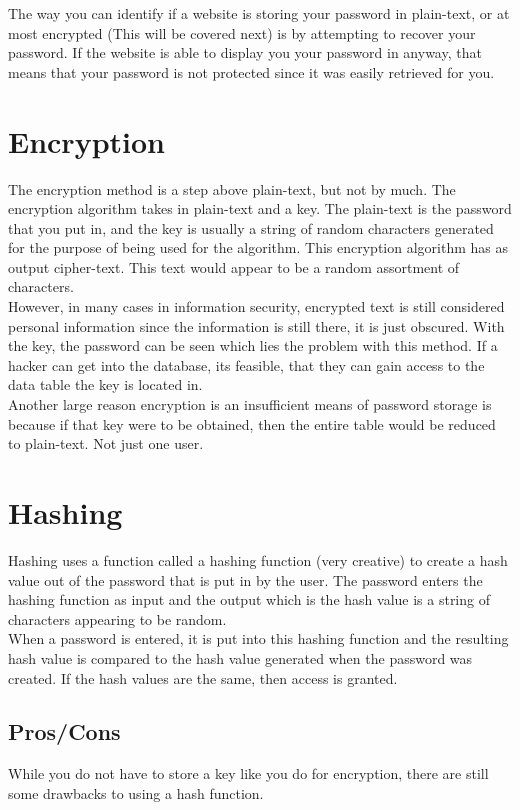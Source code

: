 \documentclass[12pt]{article}
\begin{document}
The way you can identify if a website is storing your password in plain-text, or at most encrypted (This will be covered next) is by attempting to recover your password. If the website is able to display you your password in anyway, that means that your password is not protected since it was easily retrieved for you. 
\section{Encryption}
The encryption method is a step above plain-text, but not by much. The encryption algorithm takes in plain-text and a key. The plain-text is the password that you put in, and the key is usually a string of random characters generated for the purpose of being used for the algorithm. This encryption algorithm has as output cipher-text. This text would appear to be a random assortment of characters. \\
However, in many cases in information security, encrypted text is still considered personal information since the information is still there, it is just obscured. With the key, the password can be seen which lies the problem with this method. If a hacker can get into the database, its feasible, that they can gain access to the data table the key is located in.\\
Another large reason encryption is an insufficient means of password storage is because if that key were to be obtained, then the entire table would be reduced to plain-text. Not just one user. 
\section{Hashing}
Hashing uses a function called a hashing function (very creative) to create a hash value out of the password that is put in by the user. The password enters the hashing function as input and the output which is the hash value is a string of characters appearing to be random.\\
When a password is entered, it is put into this hashing function and the resulting hash value is compared to the hash value generated when the password was created. If the hash values are the same, then access is granted. 

\adjustwidth{3em}{0pt}
\subsection{Pros/Cons}
While you do not have to store a key like you do for encryption, there are still some drawbacks to using a hash function.
\end{document}
